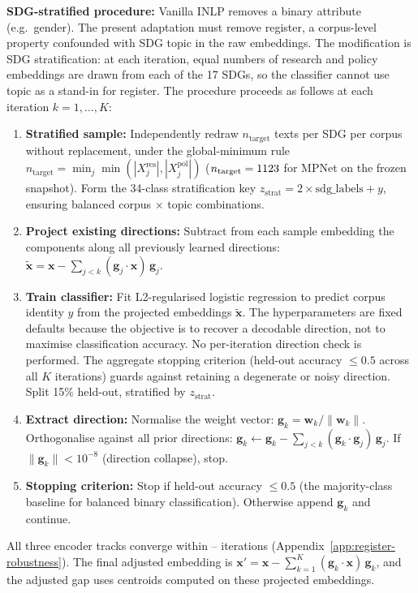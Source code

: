 \documentclass[12pt,a4paper]{article}
\begin{document}
\textbf{SDG-stratified procedure:} Vanilla INLP removes a binary attribute (e.g.\ gender). The present adaptation must remove register, a corpus-level property confounded with SDG topic in the raw embeddings. The modification is SDG stratification: at each iteration, equal numbers of research and policy embeddings are drawn from each of the 17 SDGs, so the classifier cannot use topic as a stand-in for register. The procedure proceeds as follows at each iteration $k = 1,\ldots,K$:
\begin{enumerate}
  \item \textbf{Stratified sample:} Independently redraw $n_{\text{target}}$ texts per SDG per corpus without replacement, under the global-minimum rule $n_{\text{target}} = \min_j \min(|X_j^{\text{res}}|, |X_j^{\text{pol}}|)$ ($n_{\text{target}} = 1123{}$ for MPNet on the frozen snapshot). Form the 34-class stratification key $z_{\text{strat}} = 2 \times \text{sdg\_labels} + y$, ensuring balanced corpus $\times$ topic combinations.
  \item \textbf{Project existing directions:} Subtract from each sample embedding the components along all previously learned directions: $\tilde{\mathbf{x}} = \mathbf{x} - \sum_{j<k} (\mathbf{g}_j \cdot \mathbf{x})\,\mathbf{g}_j$.
  \item \textbf{Train classifier:} Fit L2-regularised logistic regression to predict corpus identity $y$ from the projected embeddings $\tilde{\mathbf{x}}$. The hyperparameters are fixed defaults because the objective is to recover a decodable direction, not to maximise classification accuracy. No per-iteration direction check is performed. The aggregate stopping criterion (held-out accuracy $\leq 0.5$ across all $K$ iterations) guards against retaining a degenerate or noisy direction. Split 15\% held-out, stratified by $z_{\text{strat}}$.
  \item \textbf{Extract direction:} Normalise the weight vector: $\mathbf{g}_k = \mathbf{w}_k / \|\mathbf{w}_k\|$. Orthogonalise against all prior directions: $\mathbf{g}_k \leftarrow \mathbf{g}_k - \sum_{j<k} (\mathbf{g}_k \cdot \mathbf{g}_j)\,\mathbf{g}_j$. If $\|\mathbf{g}_k\| < 10^{-8}$ (direction collapse), stop.
  \item \textbf{Stopping criterion:} Stop if held-out accuracy $\leq 0.5$ (the majority-class baseline for balanced binary classification). Otherwise append $\mathbf{g}_k$ and continue.
\end{enumerate}
All three encoder tracks converge within \RegisterCrossMinilmIters{}--\RegisterCrossScibertIters{} iterations (Appendix~\ref{app:register-robustness}). The final adjusted embedding is $\mathbf{x}' = \mathbf{x} - \sum_{k=1}^{K} (\mathbf{g}_k \cdot \mathbf{x})\,\mathbf{g}_k$, and the adjusted gap uses centroids computed on these projected embeddings.
\end{document}
